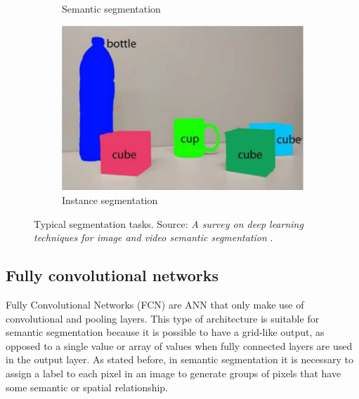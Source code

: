 \begin{figure}
\begin{subfigure}[b]{0.45\textwidth}
    \caption{Semantic segmentation}
    \label{fig:semantic}
  \end{subfigure}
\hfill
  \begin{subfigure}[b]{0.45\textwidth}
    \includegraphics[width=\linewidth]{Images/Background/s4.png}
    \caption{Instance segmentation}
    \label{fig:instance}
  \end{subfigure}
  \caption[Typical segmentation tasks]{Typical segmentation tasks. Source: \textit{A survey on deep learning techniques for image and video semantic segmentation} \cite{segmentation-survey-2}.}
  \label{fig:segment-types}
\end{figure}

\subsection{Fully convolutional networks}

Fully Convolutional Networks (FCN) are ANN that only make use of convolutional and pooling layers. This type of architecture is suitable for semantic segmentation because it is possible to have a grid-like output, as opposed to a single value or array of values when fully connected layers are used in the output layer. As stated before, in semantic segmentation it is necessary to assign a label to each pixel in an image to generate groups of pixels that have some semantic or spatial relationship.

